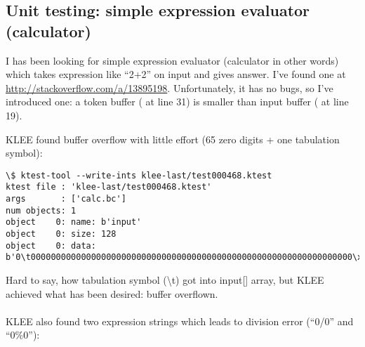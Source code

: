 \subsection{Unit testing: simple expression evaluator (calculator)}

I has been looking for simple expression evaluator (calculator in other words) which takes expression like ``2+2'' on input and gives answer.
I've found one at \url{http://stackoverflow.com/a/13895198}.
Unfortunately, it has no bugs, so I've introduced one: a token buffer ( at line 31) is smaller than input buffer ( at line 19).



KLEE found buffer overflow with little effort (65 zero digits + one tabulation symbol):

\begin{lstlisting}
\$ ktest-tool --write-ints klee-last/test000468.ktest
ktest file : 'klee-last/test000468.ktest'
args       : ['calc.bc']
num objects: 1
object    0: name: b'input'
object    0: size: 128
object    0: data: b'0\t0000000000000000000000000000000000000000000000000000000000000000\xff\xff\xff\xff\xff\xff\xff\xff\xff\xff\xff\xff\xff\xff\xff\xff\xff\xff\xff\xff\xff\xff\xff\xff\xff\xff\xff\xff\xff\xff\xff\xff\xff\xff\xff\xff\xff\xff\xff\xff\xff\xff\xff\xff\xff\xff\xff\xff\xff\xff\xff\xff\xff\xff\xff\xff\xff\xff\xff\xff\xff\xff'
\end{lstlisting}

Hard to say, how tabulation symbol (\textbackslash{}t) got into input[] array, but KLEE achieved what has been desired: buffer overflown.\\
\\
KLEE also found two expression strings which leads to division error (``0/0'' and ``0\%0''):

